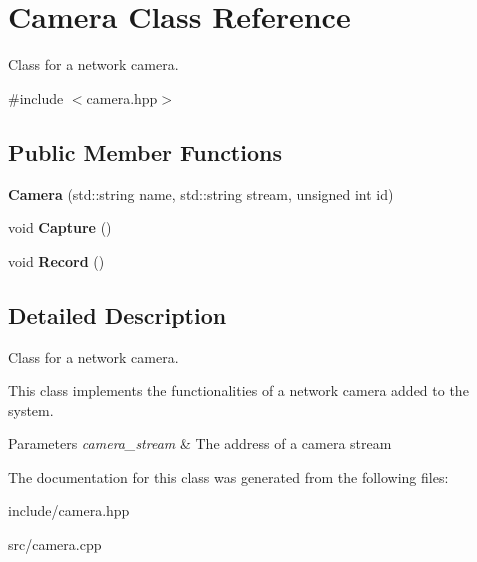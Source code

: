 \hypertarget{classCamera}{}\section{Camera Class Reference}
\label{classCamera}


Class for a network camera.  




{\ttfamily \#include $<$camera.\+hpp$>$}

\subsection*{Public Member Functions}
\begin{DoxyCompactItemize}
\item 
\mbox{\label{classCamera_a18f3f52598d6db329356be7ec0bd2a9d}} 
{\bfseries Camera} (std\+::string name, std\+::string stream, unsigned int id)
\item 
\mbox{\label{classCamera_ad66ff7f06d23b01a3a442c3019af22ce}} 
void {\bfseries Capture} ()
\item 
\mbox{\label{classCamera_ae4337f38ed32ef67067264f2665c883f}} 
void {\bfseries Record} ()
\end{DoxyCompactItemize}


\subsection{Detailed Description}
Class for a network camera. 

This class implements the functionalities of a network camera added to the system.


\begin{DoxyParams}{Parameters}
{\em camera\+\_\+stream} & The address of a camera stream \\
\hline
\end{DoxyParams}


The documentation for this class was generated from the following files\+:\begin{DoxyCompactItemize}
\item 
include/camera.\+hpp\item 
src/camera.\+cpp\end{DoxyCompactItemize}
